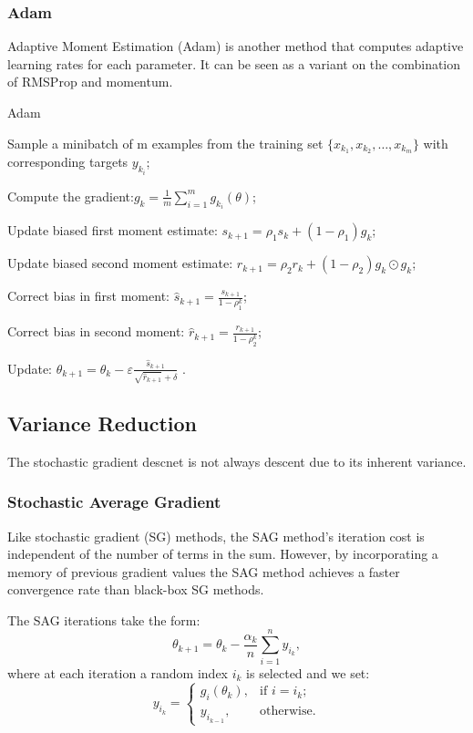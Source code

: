 \documentclass[11pt]{article} %
\begin{document}
\subsubsection{Adam}
Adaptive Moment Estimation (Adam) is another method that computes adaptive learning rates for each parameter.
It can be seen as a variant on the combination of RMSProp and momentum.

\begin{algorithm}
\caption{Adam}
\label{Adam}
 Sample a minibatch of m examples from the training set $\{x_{k_1}, x_{k_2}, \dots, x_{k_m}\}$ with corresponding targets $y_{k_i}$;

 Compute the gradient:$g_{k} = \frac{1}{m}\sum_{i=1}^{m}g_{k_{i}}({\theta})$;

 Update biased first moment estimate: $s_{k+1}={\rho}_1 s_k + (1-{\rho}_1)g_k$;

 Update biased second moment estimate: $r_{k+1}={\rho}_2 r_k + (1-{\rho}_2)g_k\odot g_k$;

 Correct bias in first moment: $\hat s_{k+1}=\frac{s_{k+1}}{1-{\rho}_{1}^k}$;

 Correct bias in second moment: $\hat r_{k+1}=\frac{r_{k+1}}{1-{\rho}_{2}^k}$;

 Update: ${\theta}_{k+1}={\theta}_k -\varepsilon \frac{\hat s_{k+1}}{\sqrt{\hat r_{k+1}}+\delta}$ .
\end{algorithm}

\subsection{Variance Reduction}
The stochastic gradient descnet is not always descent due to its inherent variance.

\subsubsection{Stochastic Average Gradient}
Like stochastic gradient (SG) methods, the SAG method’s iteration cost is independent of the number of terms in the sum.
However, by incorporating a memory of previous gradient values the SAG method achieves a faster convergence rate than black-box SG methods.


The SAG iterations take the form:
$${\theta}_{k+1}={\theta}_k - \frac{{\alpha}_k }{n}\sum _{i=1}^{n}y_{i_k} ,$$
where at each iteration a random index $i_k$ is selected and we set:
$$y_{i_k}=
\begin{cases}
g_{i}({\theta}_k),  & \text{if $i=i_k$}; \\
y_{i_{k-1}}, & \text{otherwise}.
\end{cases}$$
\end{document}

